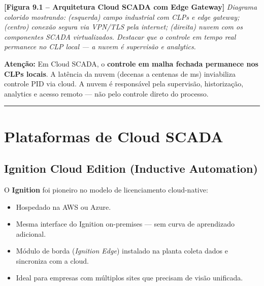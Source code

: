 \begin{caixafigura}

\textbf{{[}Figura 9.1 -- Arquitetura Cloud SCADA com Edge Gateway{]}}
\emph{Diagrama colorido mostrando: (esquerda) campo industrial com CLPs e edge gateway; (centro) conexão segura via VPN/TLS pela internet; (direita) nuvem com os componentes SCADA virtualizados. Destacar que o controle em tempo real permanece no CLP local --- a nuvem é supervisão e analytics.}

\end{caixafigura}

\begin{caixaatencao}

\textbf{Atenção:} Em Cloud SCADA, o \textbf{controle em malha fechada permanece nos CLPs locais}. A latência da nuvem (decenas a centenas de ms) inviabiliza controle PID via cloud. A nuvem é responsável pela supervisão, historização, analytics e acesso remoto --- não pelo controle direto do processo.

\end{caixaatencao}

\begin{center}\rule{0.5\linewidth}{0.5pt}\end{center}

\section{Plataformas de Cloud SCADA}\label{plataformas-de-cloud-scada}

\subsection{Ignition Cloud Edition (Inductive Automation)}\label{ignition-cloud-edition-inductive-automation}

O \textbf{Ignition} foi pioneiro no modelo de licenciamento cloud-native:

\begin{itemize}
\tightlist
\item
  Hospedado na AWS ou Azure.
\item
  Mesma interface do Ignition on-premises --- sem curva de aprendizado adicional.
\item
  Módulo de borda (\emph{Ignition Edge}) instalado na planta coleta dados e sincroniza com a cloud.
\item
  Ideal para empresas com múltiplos sites que precisam de visão unificada.
\end{itemize}

